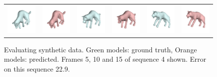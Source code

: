 \begin{figure}[t!]
\begin{tabular}{cccccc}
\includegraphics[width=0.16\linewidth]{synth_pipeline_45/gt_fit_cropped.png} & 
\includegraphics[width=0.16\linewidth]{synth_pipeline_45/3d_fit_cropped.png} &

\includegraphics[width=0.16\linewidth]{synth_pipeline_50/gt_fit_cropped.png} &
\includegraphics[width=0.16\linewidth]{synth_pipeline_50/3d_fit_cropped.png} &

\includegraphics[width=0.16\linewidth]{synth_pipeline_55/gt_fit_cropped.png} &
\includegraphics[width=0.16\linewidth]{synth_pipeline_55/3d_fit_cropped.png} \\
\end{tabular}
\caption{Evaluating synthetic data. Green models: ground truth, Orange models: predicted. Frames 5, 10 and 15 of sequence 4 shown. Error on this sequence 22.9.}
\label{fig:synth}
\end{figure}

